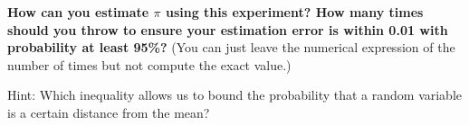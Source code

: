 \documentclass[11pt]{article}
\begin{document}
\noindent
\textbf{How can you estimate $\pi$ using this experiment? How many times should you throw to ensure your estimation error is within 0.01 with probability at least 95\%?} (You can just leave the numerical expression
of the number of times but not compute the exact value.)

\color{blue}

\noindent
Hint: Which inequality allows us to bound the probability that a random variable is a certain distance from the mean?
\end{document}
